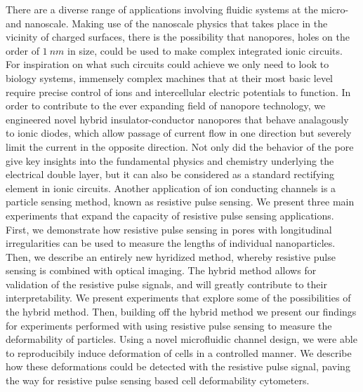 \thesisabstract
{
	There are a diverse range of applications involving fluidic systems at the micro- and nanoscale. Making use of the nanoscale physics that takes place in the vicinity of charged surfaces, there is the possibility that nanopores, holes on the order of $\SI{1}{nm}$ in size, could be used to make complex integrated ionic circuits. For inspiration on what such circuits could achieve we only need to look to biology systems, immensely complex machines that at their most basic level require precise control of ions and intercellular electric potentials to function. In order to contribute to the ever expanding field of nanopore technology, we engineered novel hybrid insulator-conductor nanopores that behave analagously to ionic diodes, which allow passage of current flow in one direction but severely limit the current in the opposite direction. Not only did the behavior of the pore give key insights into the fundamental physics and chemistry underlying the electrical double layer, but it can also be considered as a standard rectifying element in ionic circuits. Another application of ion conducting channels is a particle sensing method, known as resistive pulse sensing. We present three main experiments that expand the capacity of resistive pulse sensing applications. First, we demonstrate how resistive pulse sensing in pores with longitudinal irregularities can be used to measure the lengths of individual nanoparticles. Then, we describe an entirely new hyridized method, whereby resistive pulse sensing is combined with optical imaging. The hybrid method allows for validation of the resistive pulse signals, and will greatly contribute to their interpretability. We present experiments that explore some of the possibilities of the hybrid method. Then, building off the hybrid method we present our findings for experiments performed with using resistive pulse sensing to measure the deformability of particles. Using a novel microfluidic channel design, we were able to reproducibily induce deformation of cells in a controlled manner. We describe how these deformations could be detected with the resistive pulse signal, paving the way for resistive pulse sensing based cell deformability cytometers.
}


